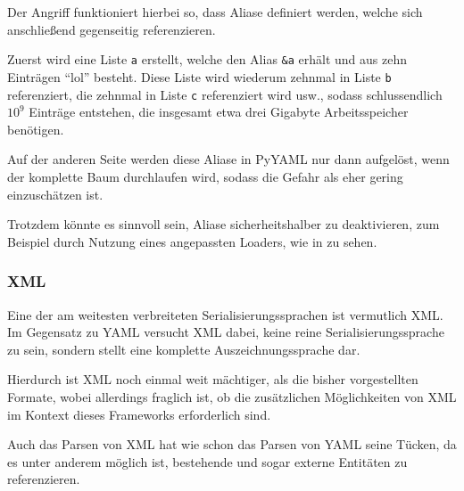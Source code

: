                 Der Angriff funktioniert hierbei so,
                dass Aliase definiert werden,
                welche sich anschließend gegenseitig referenzieren.

                Zuerst wird eine Liste
                \lstinline{a} erstellt,
                welche den Alias
                \lstinline{&a} erhält und
                aus zehn Einträgen
                \enquote{lol} besteht.
                Diese Liste wird wiederum zehnmal in Liste
                \lstinline{b} referenziert,
                die zehnmal in Liste
                \lstinline{c} referenziert wird usw.,
                sodass schlussendlich
                \( 10^9 \) Einträge entstehen,
                die insgesamt etwa drei Gigabyte Arbeitsspeicher benötigen.

                Auf der anderen Seite werden diese Aliase in PyYAML nur dann aufgelöst,
                wenn der komplette Baum durchlaufen wird,
                sodass die Gefahr als eher gering einzuschätzen ist.

                Trotzdem könnte es sinnvoll sein,
                Aliase sicherheitshalber zu deaktivieren,
                zum Beispiel durch Nutzung eines angepassten Loaders,
                wie in
                \cite{guyskk2016} zu sehen.

            \subsubsection{XML}
                Eine der am weitesten verbreiteten Serialisierungssprachen ist vermutlich
                \gls{XML}.
                Im Gegensatz zu
                \gls{YAML} versucht
                \gls{XML} dabei,
                keine reine Serialisierungssprache zu sein,
                sondern stellt eine komplette Auszeichnungssprache dar.

                Hierdurch ist
                \gls{XML} noch einmal weit mächtiger,
                als die bisher vorgestellten Formate,
                wobei allerdings fraglich ist,
                ob die zusätzlichen Möglichkeiten von
                \gls{XML} im Kontext dieses Frameworks erforderlich sind.

                Auch das Parsen von
                \gls{XML} hat
                wie schon das Parsen von
                \gls{YAML} seine Tücken,
                da es unter anderem möglich ist,
                bestehende und
                sogar externe Entitäten zu referenzieren.

